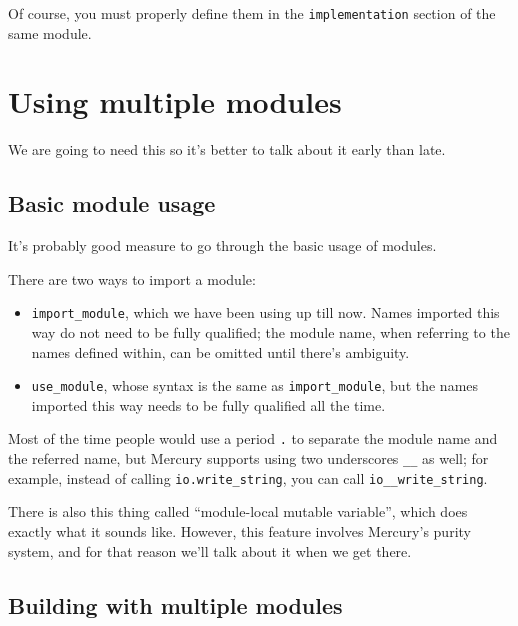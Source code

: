 Of course, you must properly define them in the \texttt{implementation} section of the same module.

\section{Using multiple modules}

We are going to need this so it's better to talk about it early than late.

\subsection{Basic module usage}

It's probably good measure to go through the basic usage of modules.

There are two ways to import a module:

\begin{itemize}
\item \texttt{import\_module}, which we have been using up till now. Names imported this way do not need to be fully qualified; the module name, when referring to the names defined within, can be omitted until there's ambiguity.
\item \texttt{use\_module}, whose syntax is the same as \texttt{import\_module}, but the names imported this way needs to be fully qualified all the time.
\end{itemize}

Most of the time people would use a period \texttt{.} to separate the module name and the referred name, but Mercury supports using two underscores \texttt{\_\_} as well; for example, instead of calling \texttt{io.write\_string}, you can call \texttt{io\_\_write\_string}.

There is also this thing called ``module-local mutable variable'', which does exactly what it sounds like. However, this feature involves Mercury's purity system, and for that reason we'll talk about it when we get there.


\subsection{Building with multiple modules}

